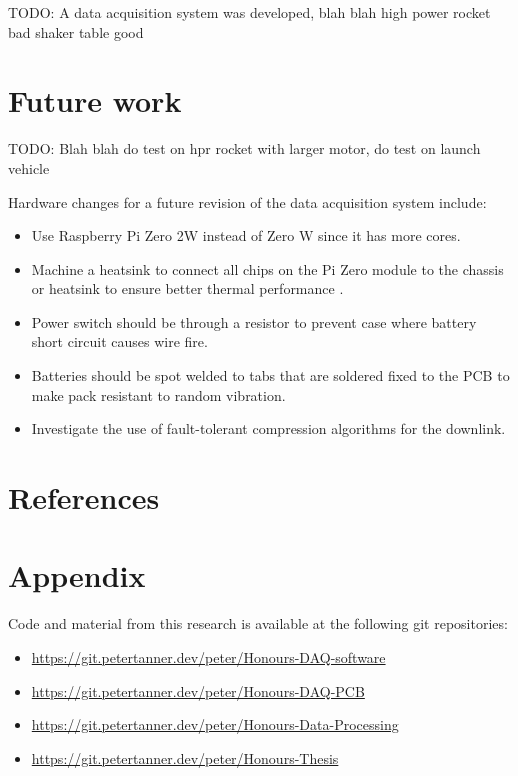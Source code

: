 \documentclass[]{report}
\begin{document}
TODO: A data acquisition system was developed, blah blah high power rocket bad shaker table good

\section{Future work}

TODO: Blah blah do test on hpr rocket with larger motor, do test on launch vehicle

Hardware changes for a future revision of the data acquisition system include:

\begin{itemize}
  \item Use Raspberry Pi Zero 2W instead of Zero W since it has more cores.
  \item Machine a heatsink to connect all chips on the Pi Zero module to the chassis or heatsink to ensure better thermal performance \cite{guertin2022raspberry}.
  \item Power switch should be through a resistor to prevent case where battery short circuit causes wire fire.
  \item Batteries should be spot welded to tabs that are soldered fixed to the PCB to make pack resistant to random vibration.
  \item Investigate the use of fault-tolerant compression algorithms for the downlink. %
\end{itemize}

\newpage

\section{References}

\printbibliography[heading=none]

\section{Appendix}

Code and material from this research is available at the following git repositories:

\begin{itemize}
  \item \url{https://git.petertanner.dev/peter/Honours-DAQ-software}
  \item \url{https://git.petertanner.dev/peter/Honours-DAQ-PCB}
  \item \url{https://git.petertanner.dev/peter/Honours-Data-Processing}
  \item \url{https://git.petertanner.dev/peter/Honours-Thesis}
\end{itemize}
\end{document}
